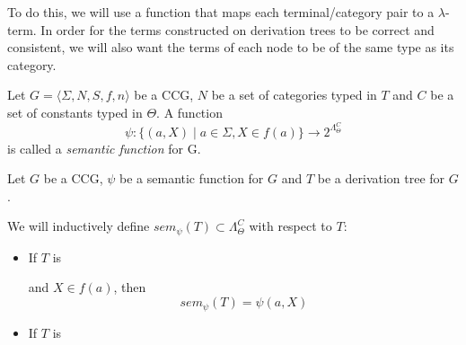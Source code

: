 \documentclass[main.tex]{subfiles}
\begin{document}
To do this, we will use a function that maps each terminal/category pair
to a $\lambda$-term. In order for the terms constructed on derivation trees
to be correct and consistent, we will also want the terms of each node to be
of the same type as its category.

\begin{defn}
    Let $ G = \langle \Sigma, N, S, f, n \rangle $ be a CCG, $N$ be
    a set of categories typed in $T$ and $C$ be a set
    of constants typed in $\Theta$.
    A function
    \[ \psi : \{ (a, X) \mid a \in \Sigma, X \in f(a) \} \rightarrow 2^{\Lambda_{\Theta}^C} \] is called a
    \emph{semantic function} for G.

\end{defn}

\begin{defn}
    Let $G$ be a CCG, $\psi$ be a semantic function for $G$ and $T$ be a
    derivation tree for $G$.

    We will inductively define $sem_{\psi}(T) \subset \Lambda_{\Theta}^C$ with
    respect to $T$:
    \begin{itemize}
        \item If $T$ is
            \begin{center}
            \end{center}
            and $X \in f(a)$, then
            \[ sem_{\psi}(T) = \psi(a, X) \]
        \item If $T$ is
            \begin{center}
\end{center}
\end{itemize}
\end{defn}
\end{document}
